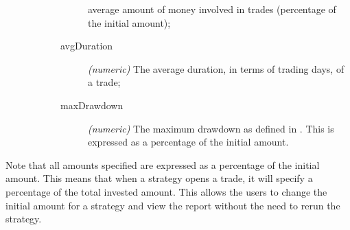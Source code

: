 \begin{description}
\begin{description}
\begin{description}
						average amount of money involved
						in trades (percentage of the
						initial amount);
					\item[avgDuration] \textit{(numeric)}
						The average duration, in terms
						of trading days, of a trade;
					\item[maxDrawdown] \textit{(numeric)}
						The maximum drawdown as defined
						in . This is
						expressed as a percentage of the
						initial amount.
				\end{description}
		\end{description}
\end{description}

Note that all amounts specified are expressed as a percentage of the initial
amount. This means that when a strategy opens a trade, it will specify a
percentage of the total invested amount. This allows the users to change the
initial amount for a strategy and view the report without the need to rerun the
strategy.
